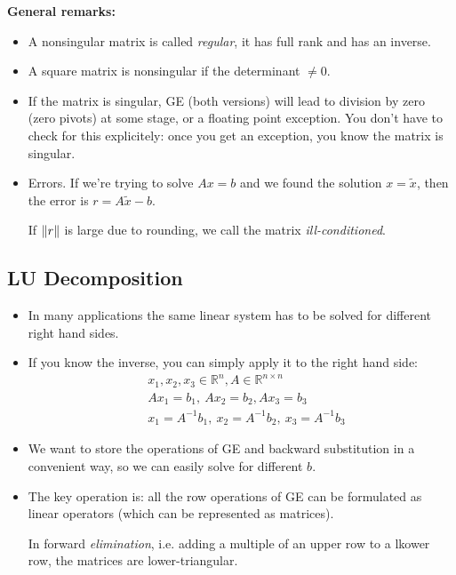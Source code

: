 \textbf{General remarks:}
\begin{itemize}
    \item {
        A nonsingular matrix is called \textit{regular}, it has full rank
        and has an inverse.
    }
    \item {
        A square matrix is nonsingular if the determinant $\ne 0$.
    }
    \item {
        If the matrix is singular, GE (both versions) will lead to division by zero
        (zero pivots) at some stage, or a floating point exception.
        You don't have to check for this explicitely: once you get an exception, 
        you know the matrix is singular.
    }
    \item {
        Errors. If we're trying to solve $Ax = b$ and we found the solution
        $x = \tilde{x}$, then the error is $r = A\tilde{x} - b$.

        If $\lVert r\rVert$ is large due to rounding, we call the matrix \textit{ill-conditioned}.
    }
\end{itemize}

\subsection{LU Decomposition}
\begin{itemize}
    \item {
        In many applications the same linear system has to be solved for different right
        hand sides.
    }
    \item {
        If you know the inverse, you can simply apply it to the right hand side:
        \begin{align*}
            &
            x_1, x_2, x_3 \in \mathbb{R}^n, A \in \mathbb{R}^{n \times n}
            \\&
            Ax_1 = b_1,\ Ax_2 = b_2, Ax_3 = b_3
            \\&
            x_1 = A^{-1} b_1,\ x_2 = A^{-1} b_2,\ x_3 = A^{-1} b_3
        \end{align*}
    }
    \item {
        We want to store the operations of GE
        and backward substitution in a convenient way,
        so we can easily solve for different $b$.
    }
    \item {
        The key operation is: all the row operations
        of GE can be formulated as linear operators (which can be represented as matrices).
        
        In forward \textit{elimination}, i.e. adding a multiple of an upper row to a lkower row, 
        the matrices are lower-triangular.
    }
\end{itemize}

